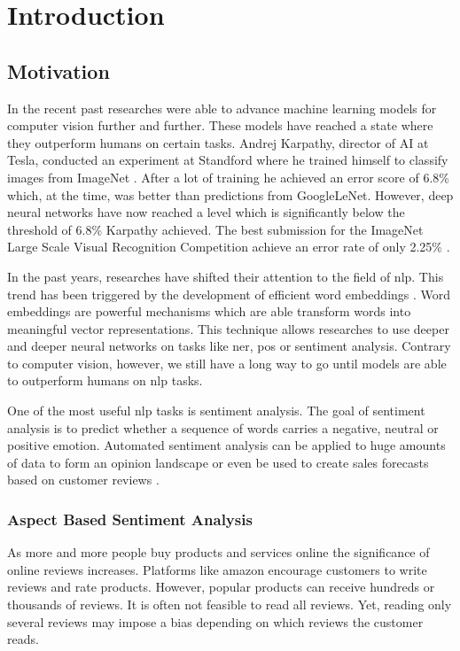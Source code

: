 \chapter{Introduction}
\label{chap:introduction}

\section{Motivation}
\label{sec:introduction_motivation}

In the recent past researches were able to advance machine learning models for computer vision further and further. These models have reached a state where they outperform humans on certain tasks. Andrej Karpathy, director of AI at Tesla, conducted an experiment at Standford where he trained himself to classify images from ImageNet \cite{Karpathy2014}. After a lot of training he achieved an error score of 6.8\% which, at the time, was better than predictions from GoogleLeNet. However, deep neural networks have now reached a level which is significantly below the threshold of 6.8\% Karpathy achieved. The best submission for the ImageNet Large Scale Visual Recognition Competition achieve an error rate of only 2.25\% \cite{Hu2018}.
\bigskip

In the past years, researches have shifted their attention to the field of \acrfull{nlp}. This trend has been triggered by the development of efficient word embeddings \cite{Mikolov2013c}. Word embeddings are powerful mechanisms which are able transform words into meaningful vector representations. This technique allows researches to use deeper and deeper neural networks on tasks like \gls{ner}, \gls{pos} or sentiment analysis. Contrary to computer vision, however, we still have a long way to go until models are able to outperform humans on \gls{nlp} tasks.
\bigskip

One of the most useful \gls{nlp} tasks is sentiment analysis. The goal of sentiment analysis is to predict whether a sequence of words carries a negative, neutral or positive emotion. Automated sentiment analysis can be applied to huge amounts of data to form an opinion landscape or even be used to create sales forecasts based on customer reviews \cite{Shen2015}. 
\medskip

\subsection*{Aspect Based Sentiment Analysis}

As more and more people buy products and services online the significance of online reviews increases. Platforms like amazon encourage customers to write reviews and rate products. However, popular products can receive hundreds or thousands of reviews. It is often not feasible to read all reviews. Yet, reading only several reviews may impose a bias depending on which reviews the customer reads.
\medskip

